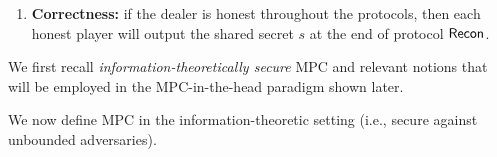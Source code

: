 \begin{definition}
\begin{enumerate}



\item {\bf Correctness:}
 if the dealer is honest throughout the protocols, then each honest player will output the shared secret $s$ at the end of protocol $\mathsf{Recon}$.
\end{enumerate}
\end{definition}


 We first recall {\em information-theoretically secure} MPC and relevant notions that will be employed in the MPC-in-the-head paradigm shown later.

 We now define MPC in the information-theoretic setting (i.e., secure against unbounded adversaries). 


